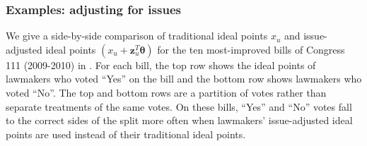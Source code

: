 \subsubsection{Examples: adjusting for issues}
We give a side-by-side comparison of traditional ideal points $x_u$
and issue-adjusted ideal points $(x_u + \bm z_u^T \bm \theta)$ for the
ten most-improved bills of Congress 111 (2009-2010) in
.  For each bill, the top row shows the
ideal points of lawmakers who voted ``Yes'' on the bill and the bottom
row shows lawmakers who voted ``No''.  The top and bottom rows are a
partition of votes rather than separate treatments of the same votes.
On these bills, ``Yes'' and ``No'' votes fall to the correct sides of
the split more often when lawmakers' issue-adjusted ideal points are
used instead of their traditional ideal points.

